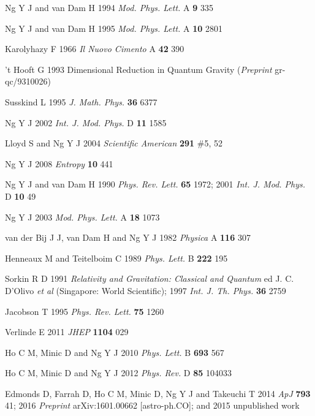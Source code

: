\documentclass[a4paper]{jpconf}
\begin{document}
\begin{thebibliography}{50}

Ng Y J and van Dam H 1994
{\it Mod. Phys. Lett.} A {\bf 9} 335

Ng Y J and van Dam H 1995
{\it Mod. Phys. Lett.} A {\bf 10} 2801

Karolyhazy F 1966 {\it Il Nuovo Cimento} A {\bf 42} 390 


't Hooft G 1993 Dimensional Reduction in Quantum Gravity
({\it Preprint} gr-qc/9310026)

Susskind L 1995 {\it J. Math. Phys.} {\bf 36} 6377

Ng Y J 2002 {\it Int. J. Mod. Phys.} D {\bf 11} 1585 

Lloyd S and Ng Y J 2004
{\it Scientific American} {\bf 291} \#5, 52


Ng Y J 2008 {\it Entropy} {\bf 10} 441 


Ng Y J and van Dam H 1990 {\it Phys. Rev. Lett.} {\bf 65} 1972; 
2001 {\it Int. J. Mod. Phys.} D {\bf 10} 49 


Ng Y J 2003 {\it Mod. Phys. Lett.} A {\bf 18} 1073 


van der Bij J J, van Dam H and Ng Y J 1982 {\it Physica} A {\bf 116} 307


Henneaux M and Teitelboim C 1989 {\it Phys. Lett.} B {\bf 222} 195 

Sorkin R D 1991 {\it Relativity and
Gravitation: Classical and Quantum} ed J. C. D'Olivo {\it et al} 
(Singapore: World
Scientific); 1997 {\it Int. J. Th. Phys.} {\bf 36} 2759 

Jacobson T 1995 {\it Phys. Rev. Lett.} {\bf 75} 1260

Verlinde E 2011 {\it JHEP} {\bf 1104} 029

Ho C M, Minic D and Ng Y J 2010 {\it Phys. Lett.} B {\bf 693} 567 


Ho C M, Minic D and Ng Y J 2012 {\it Phys. Rev.} D {\bf 85} 104033

Edmonds D, Farrah D, Ho C M, Minic D, Ng Y J and Takeuchi T 2014
{\it ApJ} {\bf 793} 41; 2016 {\it Preprint} arXiv:1601.00662 [astro-ph.CO]; 
and 2015 unpublished work




\end{thebibliography}
\end{document}
